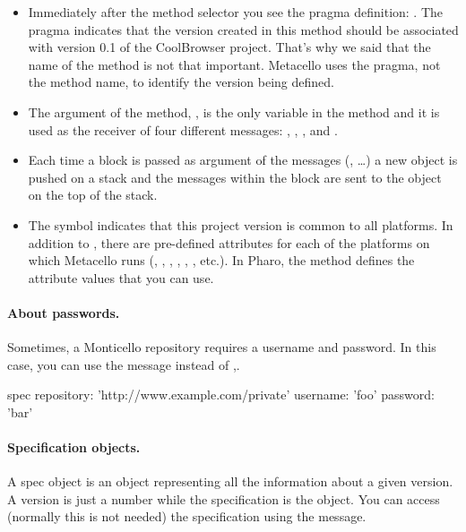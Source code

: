 \documentclass[a4paper,10pt,twoside]{book}
\begin{document}
\begin{itemize}
\item Immediately after the method selector you see the pragma definition:  . The pragma  indicates that the version created in this method should be associated with version 0.1 of the CoolBrowser project. That's why we said that the name of the method is not that important. Metacello uses the pragma, not the method name, to identify the version being defined.

\item The argument of the method, , is the only variable in
the method and it is used as the receiver of four different messages: , ,    , and  .

\item Each time a block is passed as argument of the messages (, \dots) a new object is pushed on a stack and the messages within the block are sent to the object on the top of the stack.

\item The symbol  indicates that this project version is common to all platforms.  In addition to , there are pre-defined attributes for each of the platforms on which Metacello runs (, , , , , , etc.). In Pharo, the method  defines the attribute values that you can use.
\end{itemize}

\paragraph{About passwords.} Sometimes, a Monticello repository requires a username and password. In this case,  you can use the message  instead of ,.

\begin{code}{}
         spec repository: 'http://www.example.com/private' username: 'foo' password: 'bar'
\end{code}


\paragraph{Specification objects.}
A spec object is an object representing all the information about a given version. A version is just a number
while the specification is the object. You can access (normally this is not needed) the specification using the  message.
\end{document}
